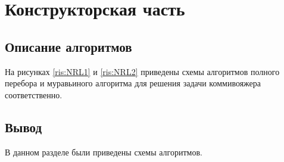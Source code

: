\chapter{Конструкторская часть}
\section{Описание алгоритмов}
На рисунках \ref{ris:NRL1} и \ref{ris:NRL2} приведены схемы алгоритмов полного перебора и муравьиного алгоритма для решения задачи коммивояжера соответственно.
\begin{center}	
	\centering
	\def\svgwidth{12cm}
	
	\label{ris:NRL1}
\end{center}
\begin{center}	
	\centering
	\def\svgwidth{15cm}
	
	\label{ris:NRL2}
\end{center}
\section*{\hsp Вывод}
В данном разделе были приведены схемы алгоритмов.